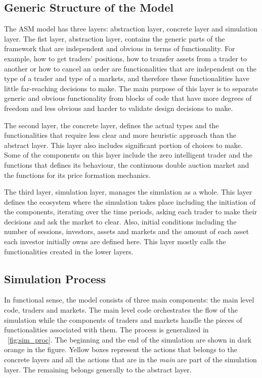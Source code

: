 \subsection{Generic Structure of the Model}
The ASM model has three layers: abstraction layer, concrete 
layer and simulation layer. The fist layer, abstraction layer, contains the 
generic parts of the framework that are independent and obvious in terms
of functionality. For example, how to get traders' positions, how to
transfer assets from a trader to another or how to cancel an order are
functionalities that are independent on the type of a trader 
and type of a markets, and therefore these functionalities have little
far-reaching decisions to make. The main purpose of this layer
is to separate generic and obvious functionality from blocks of code
that have more degrees of freedom and less obvious and harder to validate 
design decisions to make.

The second layer, the concrete layer, defines the actual types and the
functionalities that require less clear and more heuristic
approach than the abstract layer. This layer also includes significant
portion of choices to make. Some of the components
on this layer include the zero intelligent trader and the
functions that defines its behaviour, the continuous double auction
market and the functions for its price formation mechanics.

The third layer, simulation layer, manages the simulation as a whole.
This layer defines the ecosystem where the simulation takes place including
the initiation of the components, iterating over the time periods, asking
each trader to make their decisions and ask the market to clear. 
Also, initial conditions including the number of sessions, investors, assets and markets
and the amount of each asset each investor initially owns are defined here. 
This layer mostly calls the functionalities created in the lower layers.



\subsection{Simulation Process}
In functional sense, the model consists of three main components:
the main level code, traders and markets. The main level code 
orchestrates the flow of the simulation while the components of traders 
and markets handle the pieces of functionalities associated with them. The process
is generalized in ~\ref{fig:sim_proc}. The beginning and the end of the 
simulation are shown in dark orange in the figure. Yellow boxes represent
the actions that belongs to the concrete layers and all the actions that
are in the \textit{main} are part of the simulation layer. The remaining belongs
generally to the abstract layer.


